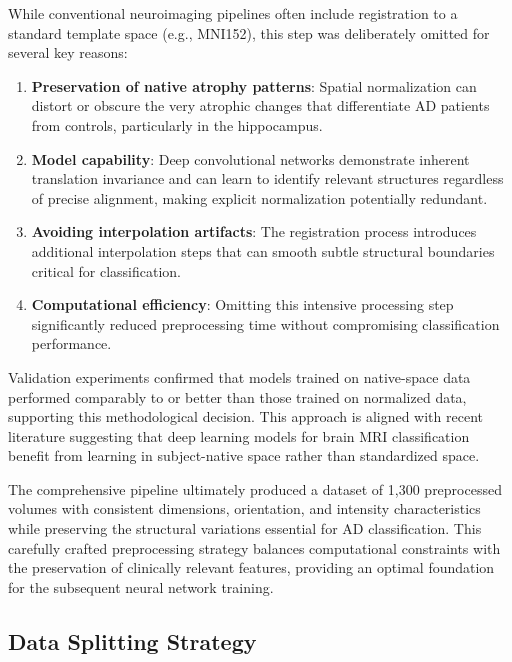 \documentclass[12pt, a4paper]{article}
\begin{document}
While conventional neuroimaging pipelines often include registration to a standard template space (e.g., MNI152), this step was deliberately omitted for several key reasons:

\begin{enumerate}
    \item \textbf{Preservation of native atrophy patterns}: Spatial normalization can distort or obscure the very atrophic changes that differentiate AD patients from controls, particularly in the hippocampus.
    
    \item \textbf{Model capability}: Deep convolutional networks demonstrate inherent translation invariance and can learn to identify relevant structures regardless of precise alignment, making explicit normalization potentially redundant.
    
    \item \textbf{Avoiding interpolation artifacts}: The registration process introduces additional interpolation steps that can smooth subtle structural boundaries critical for classification.
    
    \item \textbf{Computational efficiency}: Omitting this intensive processing step significantly reduced preprocessing time without compromising classification performance.
\end{enumerate}

Validation experiments confirmed that models trained on native-space data performed comparably to or better than those trained on normalized data, supporting this methodological decision. This approach is aligned with recent literature suggesting that deep learning models for brain MRI classification benefit from learning in subject-native space rather than standardized space.

The comprehensive pipeline ultimately produced a dataset of 1,300 preprocessed volumes with consistent dimensions, orientation, and intensity characteristics while preserving the structural variations essential for AD classification. This carefully crafted preprocessing strategy balances computational constraints with the preservation of clinically relevant features, providing an optimal foundation for the subsequent neural network training.

\subsection{Data Splitting Strategy}
\end{document}
